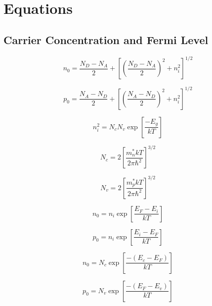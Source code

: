 \documentclass{infosheet}
\begin{document}
\section{Equations}

\subsection{Carrier Concentration and Fermi Level}

\begin{displaymath}
  n_0 = \frac{N_D-N_A}{2} + \left[\left(\frac{N_D-N_A}{2}\right)^2+n_i^2\right]^{1/2}
\end{displaymath}

\begin{displaymath}
  p_0 = \frac{N_A-N_D}{2} + \left[\left(\frac{N_A-N_D}{2}\right)^2+n_i^2\right]^{1/2}
\end{displaymath}

\begin{displaymath}
  n_i^2 = N_cN_v\exp\left[\frac{-E_g}{kT}\right]
\end{displaymath}

\begin{multicols}{2}
  \begin{displaymath}
    N_c = 2\left[\frac{m_n^*kT}{2\pi\hbar^2}\right]^{3/2}
  \end{displaymath}
  
  \begin{displaymath}
    N_v = 2\left[\frac{m_p^*kT}{2\pi\hbar^2}\right]^{3/2}
  \end{displaymath}
\end{multicols}

\begin{multicols}{2}
  \begin{displaymath}
    n_0 = n_i\exp\left[\frac{E_F-E_i}{kT}\right]
  \end{displaymath}
  
  \begin{displaymath}
    p_0 = n_i\exp\left[\frac{E_i-E_F}{kT}\right]
  \end{displaymath}
\end{multicols}

\begin{multicols}{2}
  \begin{displaymath}
    n_0 = N_c\exp\left[\frac{-(E_c-E_F)}{kT}\right]
  \end{displaymath}
  
  \begin{displaymath}
    p_0 = N_v\exp\left[\frac{-(E_F-E_v)}{kT}\right]
  \end{displaymath}
\end{multicols}
\end{document}
